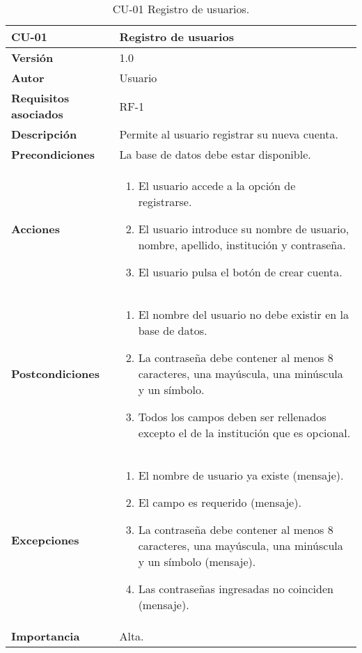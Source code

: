 \begin{table}[p]
	\centering
	\begin{tabularx}{\linewidth}{ p{} p{} }
		\toprule
		\textbf{CU-01}    & \textbf{Registro de usuarios}\\
		\toprule
		\textbf{Versión}              & 1.0    \\
		\textbf{Autor}                & Usuario \\
		\textbf{Requisitos asociados} & RF-1\\
		\textbf{Descripción}          & Permite al usuario registrar su nueva cuenta. \\
		\textbf{Precondiciones}         & La base de datos debe estar disponible. \\
		\textbf{Acciones}             &
		\begin{enumerate}
			\def\labelenumi{\arabic{enumi}.}
			\tightlist
			\item El usuario accede a la opción de registrarse.
			\item El usuario introduce su nombre de usuario, nombre, apellido, institución y contraseña.
            \item El usuario pulsa el botón de crear cuenta.
		\end{enumerate}\\
         \textbf{Postcondiciones}             &
		\begin{enumerate}
			\def\labelenumi{\arabic{enumi}.}
			\tightlist
			\item El nombre del usuario no debe existir en la base de datos.
			\item La contraseña debe contener al menos 8 caracteres, una mayúscula, una minúscula y un símbolo.
            \item Todos los campos deben ser rellenados excepto el de la institución que es opcional.
		\end{enumerate}\\
		\textbf{Excepciones}             &
		\begin{enumerate}
			\def\labelenumi{\arabic{enumi}.}
			\tightlist
			\item El nombre de usuario ya existe (mensaje).
			\item El campo es requerido (mensaje).
            \item La contraseña debe contener al menos 8 caracteres, una mayúscula, una minúscula y un símbolo (mensaje).
            \item Las contraseñas ingresadas no coinciden (mensaje).
		\end{enumerate}\\
		\textbf{Importancia}          & Alta. \\
		\bottomrule
	\end{tabularx}
	\caption{CU-01 Registro de usuarios.}
\end{table}

